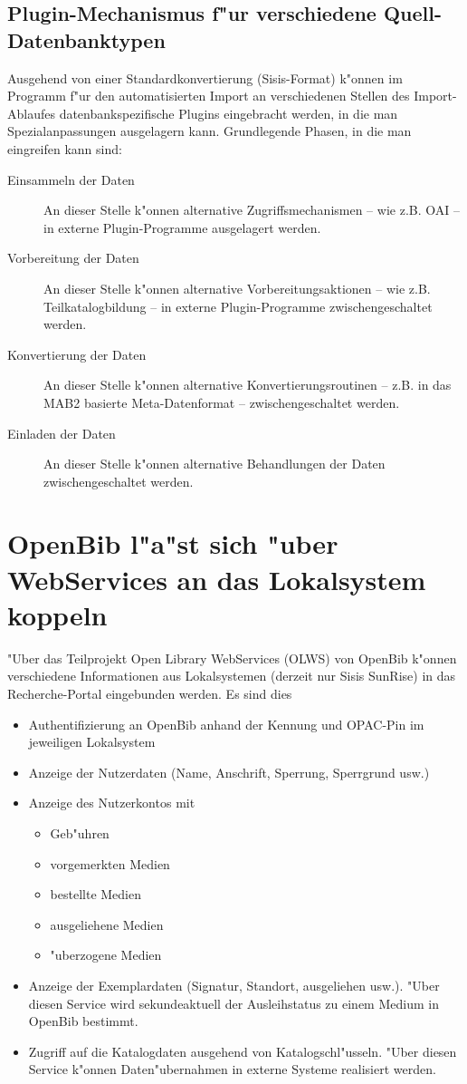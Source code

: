 \documentclass[11pt, twoside, a4paper, BCOR8mm, DIV12, bibtotoc,idxtotoc]{scrbook}
\begin{document}
\begin{itemize}
\subsection{Plugin-Mechanismus f"ur verschiedene Quell-Datenbanktypen}
Ausgehend von einer Standardkonvertierung (Sisis-Format) k"onnen im
Programm f"ur den automatisierten Import an verschiedenen Stellen des
Import-Ablaufes datenbankspezifische Plugins eingebracht werden, in die
man Spezialanpassungen ausgelagern kann. Grundlegende Phasen, in die
man eingreifen kann sind:
\begin{description}
\item[Einsammeln der Daten] An dieser Stelle k"onnen alternative
  Zugriffsmechanismen -- wie z.B. OAI --
  in externe Plugin-Programme ausgelagert werden.
\item[Vorbereitung der Daten] An dieser Stelle k"onnen alternative
  Vorbereitungsaktionen -- wie z.B. Teilkatalogbildung -- in externe
  Plugin-Programme zwischengeschaltet werden.
\item[Konvertierung der Daten] An dieser Stelle k"onnen alternative
  Konvertierungsroutinen -- z.B. in das MAB2 basierte Meta-Datenformat
  -- zwischengeschaltet werden.
\item[Einladen der Daten] An dieser Stelle k"onnen alternative
  Behandlungen der Daten zwischengeschaltet werden.
\end{description}

\section{OpenBib l"a"st sich "uber WebServices an das Lokalsystem koppeln}
"Uber das Teilprojekt Open Library WebServices (OLWS) von OpenBib
k"onnen verschiedene Informationen aus Lokalsystemen (derzeit nur
Sisis SunRise) in das Recherche-Portal eingebunden werden. Es sind
dies
\begin{itemize}
\item Authentifizierung an OpenBib anhand der Kennung und OPAC-Pin im
  jeweiligen Lokalsystem
\item Anzeige der Nutzerdaten (Name, Anschrift, Sperrung, Sperrgrund usw.)
\item Anzeige des Nutzerkontos mit
  \begin{itemize}
  \item Geb"uhren
  \item vorgemerkten Medien
  \item bestellte Medien
  \item ausgeliehene Medien
  \item "uberzogene Medien
  \end{itemize}
\item Anzeige der Exemplardaten (Signatur, Standort, ausgeliehen
  usw.). "Uber diesen Service wird sekundeaktuell der Ausleihstatus zu
  einem Medium in OpenBib bestimmt.
\item Zugriff auf die Katalogdaten ausgehend von
  Katalogschl"usseln. "Uber diesen Service k"onnen Daten"ubernahmen in
  externe Systeme realisiert werden.
\end{itemize}


\end{itemize}
\end{document}

